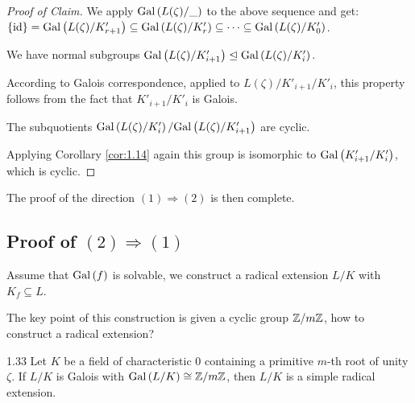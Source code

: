 \documentclass[twoside = false,	%
		headsepline,		%
		parskip = true,
		]{scrbook}						%
\begin{document}
    \begin{proof}[Proof of Claim]
        We apply $\mathrm{Gal}\left( L(\zeta)/\_\right)$ to the above sequence and get:
        $\{\mathrm{id}\} = \mathrm{Gal}\left( L(\zeta)/K'_{r+1}\right) \subseteq \mathrm{Gal}\left( L(\zeta)/K'_r\right) \subseteq \dots \subseteq \mathrm{Gal}\left( L(\zeta)/K'_0\right)$.
        
        We have normal subgroups $\mathrm{Gal}\left( L(\zeta)/K'_{i+1}\right) \trianglelefteq \mathrm{Gal}\left( L(\zeta)/K'_i\right)$.
        
        According to Galois correspondence, applied to $L(\zeta)/K'_{i+1}/K'_i$, this property follows from the fact that $K'_{i+1}/K'_i$ is Galois.
        
        The subquotients $\mathrm{Gal}\left( L(\zeta)/K'_i\right)/\mathrm{Gal}\left( L(\zeta)/K'_{i+1}\right)$ are cyclic.
        
        Applying Corollary \ref{cor:1.14} again this group is isomorphic to $\mathrm{Gal}\left( K'_{i+1}/K'_i\right)$, which is cyclic.
        
    \end{proof}
    
    The proof of the direction $(1) \Rightarrow (2)$ is then complete.
    
    \subsection*{Proof of $(2)\Rightarrow (1)$} 
    Assume that $\mathrm{Gal}\left( f\right)$ is solvable, we construct a radical extension $L/K$ with $K_f \subseteq L$.
    
    The key point of this construction is given a cyclic group $\mathbb Z/m\mathbb Z$, how to construct a radical extension?
    
    \begin{lemma}{}{1.33}
        Let $K$ be a field of characteristic $0$ containing a primitive $m$-th root of unity $\zeta$. If $L/K$ is Galois with $\mathrm{Gal}\left( L/K\right) \cong \mathbb Z/m\mathbb Z$, then $L/K$ is a simple radical extension.
    \end{lemma}
    
\end{document}
